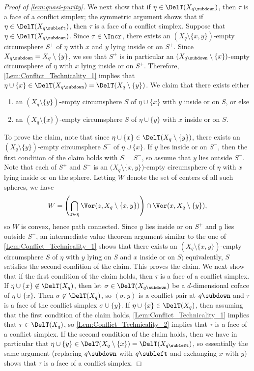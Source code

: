\begin{proof}[Proof of \cref{lem:quasi-purity}]
%
We next show that if $\eta\in \DelT(X_{q{\subdown}})$, then $\tau$ is a face of a conflict simplex; the symmetric argument shows that if $\eta\in \DelT(X_{q{\subleft}})$, then $\tau$ is a face of a conflict simplex.  Suppose that $\eta\in \DelT(X_{q{\subdown}})$.  Since $\tau\in \Incr$, there exists an $(X_{q}\setminus \{x,y\})$-empty circumsphere $S^+$ of $\eta$ with $x$ and $y$ lying inside or on $S^+$.  Since $X_{q{\subdown}}= X_{q}\setminus \{y\}$, we see that $S^+$ is in particular an $(X_{q{\subdown}}\setminus \{x\})$-empty circumsphere of $\eta$ with $x$ lying inside or on $S^+$.  Therefore, \cref{Lem:Conflict_Technicality_1} implies that $\eta\cup\{x\}\in \DelT(X_{q{\subdown}})=\DelT(X_{q}\setminus \{y\})$.
%
We claim that there exists either 
\begin{enumerate}
\item an $(X_q\setminus \{y\})$-empty circumsphere $S$ of $\eta\cup\{x\}$ with $y$ inside or on $S$, or else 
\item an $(X_q\setminus \{x\})$-empty circumsphere $S$ of $\eta\cup\{y\}$ with $x$ inside or on $S$.
\end{enumerate}
%
To prove the claim, note that since $\eta\cup\{x\} \in \DelT(X_{q}\setminus \{y\})$, there exists an $(X_q\setminus \{y\})$-empty circumsphere $S^-$ of $\eta\cup\{x\}$.   If $y$ lies inside or on $S^-$, then the first condition of the claim holds with $S=S^-$, so assume that $y$ lies outside $S^-$.  Note that each of $S^+$ and $S^-$ is an $(X_q\setminus \{x,y\}$)-empty circumsphere of $\eta$ with $x$ lying inside or on the sphere.  Letting $W$ denote the set of centers of all such spheres, we have \[W=\left(\bigcap_{z\in \eta} \Vor(z, X_q\setminus \{x,y\})\right) \cap \Vor(x,X_q\setminus \{y\}),\] so $W$ is convex, hence path connected.    Since $y$ lies inside or on $S^+$ and $y$ lies outside $S^-$, an intermediate value theorem argument similar to the one of \cref{Lem:Conflict_Technicality_1} shows that there exists an $(X_q\setminus \{x,y\})$-empty circumsphere $S$ of $\eta$ with $y$ lying on $S$ and $x$ inside or on $S$; equivalently, $S$ satisfies the second condition of the claim.  This proves the claim.  
%
We next show that if the first condition of the claim holds, then $\tau$ is a face of a conflict simplex.  If $\eta\cup\{x\}\not \in \DelT(X_{q})$, then let  $\sigma\in \DelT(X_{q{\subdown}})$ be a $d$-dimensional coface of $\eta\cup\{x\}$.  Then $\sigma\not\in \DelT(X_{q})$, so $(\sigma,y)$ is a conflict pair at $q{\subdown}$ and  $\tau$ is a face of the conflict simplex $\sigma\cup \{y\}$.  If $\eta\cup\{x\}\in \DelT(X_{q})$, then assuming that the first condition of the claim holds, \cref{Lem:Conflict_Technicality_1} implies that $\tau\in \DelT(X_q)$, so \cref{Lem:Conflict_Technicality_2} implies that $\tau$ is a face of a conflict simplex.
%
If the second condition of the claim holds, then we have in particular that $\eta\cup\{y\}\in  \DelT(X_{q}\setminus \{x\})=\DelT(X_{q{\subleft}})$, so essentially the same argument (replacing $q{\subdown}$ with $q{\subleft}$ and exchanging $x$ with $y$) shows that $\tau$ is a face of a conflict simplex.
\end{proof}
